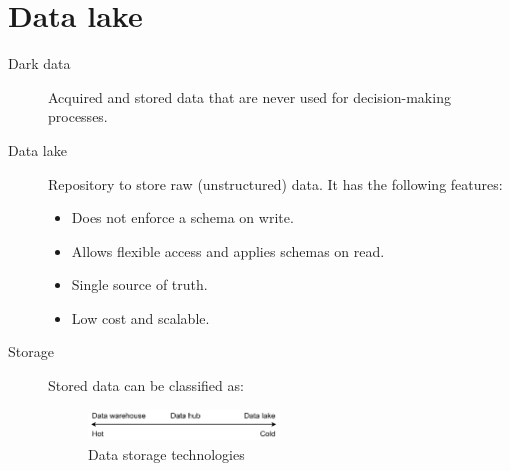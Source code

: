 \section{Data lake}
\begin{description}
    \item[Dark data] 
        Acquired and stored data that are never used for decision-making processes.

    \item[Data lake] 
        Repository to store raw (unstructured) data.
        It has the following features:
        \begin{itemize}
            \item Does not enforce a schema on write.
            \item Allows flexible access and applies schemas on read.
            \item Single source of truth.
            \item Low cost and scalable.
        \end{itemize}

    \item[Storage]
        Stored data can be classified as:

        \begin{figure}[ht]
            \centering
            \includegraphics[width=0.5\textwidth]{img/_storage.pdf}
            \caption{Data storage technologies}
        \end{figure}
\end{description}


